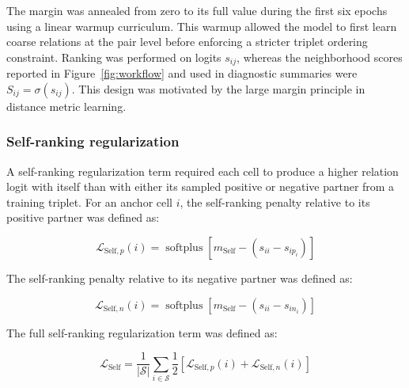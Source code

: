 \documentclass[11pt]{article}
\begin{document}
The margin was annealed from zero to its full value during the first six epochs using a linear warmup curriculum. This warmup allowed the model to first learn coarse relations at the pair level before enforcing a stricter triplet ordering constraint. Ranking was performed on logits \(s_{ij}\), whereas the neighborhood scores reported in Figure~\ref{fig:workflow} and used in diagnostic summaries were \(S_{ij}=\sigma(s_{ij})\). This design was motivated by the large margin principle in distance metric learning\cite{Weinberger2009LMNN}.

\subsubsection*{Self-ranking regularization}

A self-ranking regularization term required each cell to produce a higher relation logit with itself than with either its sampled positive or negative partner from a training triplet. For an anchor cell \(i\), the self-ranking penalty relative to its positive partner was defined as:

\begin{equation}
\mathcal{L}_{\mathrm{Self},p}(i)=
\operatorname{softplus}
\left[
m_{\mathrm{Self}}-(s_{ii}-s_{ip_i})
\right]
  \label{eq:Self_p}
\end{equation}

The self-ranking penalty relative to its negative partner was defined as:

\begin{equation}
\mathcal{L}_{\mathrm{Self},n}(i)=
\operatorname{softplus}
\left[
m_{\mathrm{Self}}-(s_{ii}-s_{in_i})
\right]
  \label{eq:Self_n}
\end{equation}

The full self-ranking regularization term was defined as:

\begin{equation}
\mathcal{L}_{\mathrm{Self}}=
\frac{1}{|\mathcal{S}|}
\sum_{i\in\mathcal{S}}
\frac{1}{2}
\left[
\mathcal{L}_{\mathrm{Self},p}(i)
+
\mathcal{L}_{\mathrm{Self},n}(i)
\right]
  \label{eq:Self_total}
\end{equation}
\end{document}
